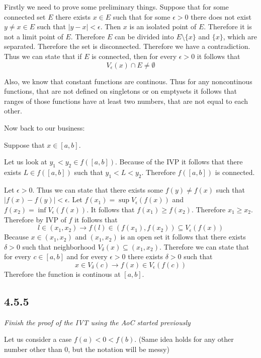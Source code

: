 \documentclass[11pt,oneside,titlepage]{book}
\begin{document}
Firstly we need to prove some preliminary things.
Suppose that for some connected set $E$ there exists $x \in E$ such
that for some $\epsilon > 0$ there does not exist $y \neq x \in E$ such
that $|y - x| < \epsilon$. Then $x$ is an isolated point of $E$.
Therefore it is not a limit point of $E$.
Therefore $E$ can be divided into $E \setminus \{x\}$ and $\{x\}$, which are
separated. Therefore the set is disconnected. Therefore we have a
contradiction. Thus we can state that if $E$ is connected,
then for every $\epsilon > 0$ it follows that 
$$V_\epsilon(x) \cap E \neq \emptyset$$

Also, we know that constant functions are continous. Thus for
any noncontinous functions, that are not defined on singletons
or on emptysets it follows that ranges of those functions have
at least two numbers, that are not equal to each other.

Now back to our business:

Suppose that $x \in [a, b]$.

Let us look at $y_1 < y_2 \in f([a, b])$. Because of the IVP
it follows that there
exists $L \in f([a, b])$ such that $ y_1 < L < y_2$. Therefore
$f([a, b])$ is connected.



Let $\epsilon > 0$.
Thus we can state that there exists some $f(y) \neq f(x)$ such that
$|f(x) - f(y)| < \epsilon$. Let $f(x_1) = \sup{V_\epsilon(f(x))}$
and $f(x_2) = \inf{V_\epsilon(f(x))}$. It follows that
$f(x_1) \geq f(x_2)$. Therefore $x_1 \geq x_2$. Therefore by IVP of $f$ 
it follows that
$$l \in (x_1, x_2) \to f(l) \in (f(x_1), f(x_2)) \subseteq V_\epsilon(f(x))$$
Because $x \in (x_1, x_2)$ and $(x_1, x_2)$ is an open set it follows that
there exists $\delta > 0$ such that neighborhood
$V_\delta(x) \subseteq (x_1, x_2)$. Therefore we can state that for every
$c \in [a, b]$ and
for every $\epsilon > 0$ there exists $\delta > 0$ such that
$$x \in V_\delta(c)  \to f(x) \in V_\epsilon(f(c))$$
Therefore the function is continous at $[a, b]$.

\subsection*{4.5.5}
\textit{Finish the proof of the IVT using the AoC started previously}

Let us consider a case $f(a) < 0 < f(b)$. (Same idea holds for any other
number other than 0, but the notation will be messy)
\end{document}
